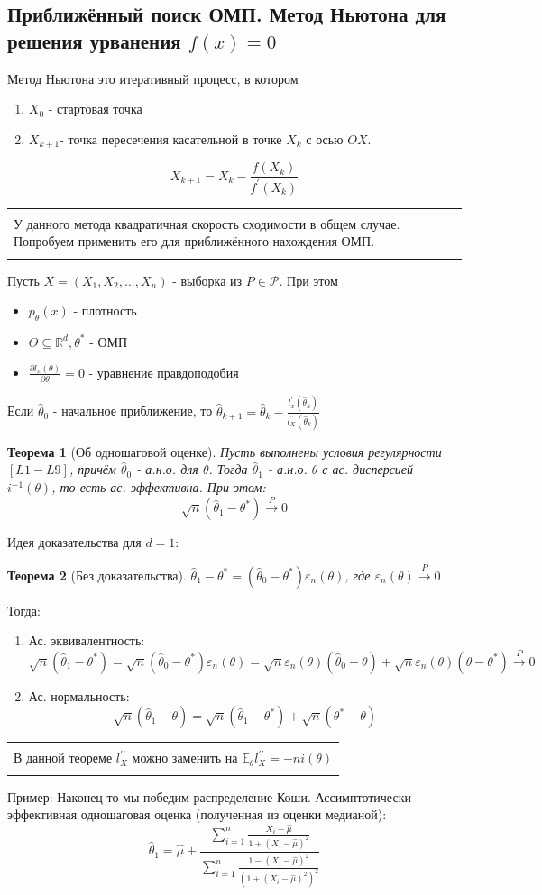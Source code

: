 \documentclass[a4paper,12pt]{article}
\newcommand{\expec}{\mathbb{E}}
\newcommand{\pconv}{\overset{P}{\to}}
\newcommand{\sumin}{\sum\limits_{i=1}^n}
\newcommand{\sample}{X_1, X_2, ..., X_n}
\newcommand{\R}{\mathbb{R}}
\newenvironment{annotation}{\begin{center}
    \begin{tabular}{|p{0.9\textwidth}|}
    \hline\\
}
{ 
    \\\\\hline
    \end{tabular} 
    \end{center}
}
\theoremstyle{named}
\newtheorem*{namedtheorem}{Теорема}
\begin{document}
\subsection{Приближённый поиск ОМП. Метод Ньютона для решения урванения $f(x) = 0$}
Метод Ньютона это итеративный процесс, в котором 
\begin{enumerate}
    \item $X_0$ - стартовая точка
    \item $X_{k+1}$-  точка пересечения касательной в точке $X_k$ с осью $OX$.
\end{enumerate}
$$
    X_{k+1}  = X_k - \frac{f(X_k)}{f^\prime(X_k)}
$$
\begin{annotation}
    У данного метода квадратичная скорость сходимости в общем случае. Попробуем применить его для приближённого нахождения ОМП. 
\end{annotation}
Пусть $X = (\sample)$ - выборка из $P \in \mathcal{P}$. При этом 
\begin{itemize}
    \item $p_\theta(x)$ - плотность 
    \item $\Theta \subseteq \R^d, \theta^*$  - ОМП
    \item $\frac{\partial l_x(\theta)}{\partial \theta} = 0$ - уравнение правдоподобия
\end{itemize}
Если $\hat\theta_0 $ - начальное приближение, то $\hat\theta_{k+1} = \hat\theta_k - \frac{l^\prime_x(\hat\theta_k)}{l_X^{\prime\prime}(\hat\theta_k)}$
\begin{namedtheorem}[Об одношаговой оценке]
    Пусть выполнены условия регулярности $[L1-L9]$, причём $\hat\theta_0$ - а.н.о. для $\theta$. Тогда $\hat\theta_1$ - а.н.о. $\theta$ 
    с ас. дисперсией $i^{-1}(\theta)$, то есть ас. эффективна. При этом:
    $$
        \sqrt{n}(\hat\theta_1 - \theta^*) \pconv 0
    $$
\end{namedtheorem}
Идея доказательства для $d=1$:
\begin{namedtheorem}[Без доказательства]
    $\hat\theta_1 - \theta^* = (\hat\theta_0 - \theta^*)\varepsilon_n(\theta)$, где $\varepsilon_n(\theta) \pconv 0$
\end{namedtheorem}
Тогда:
\begin{enumerate}
    \item Ас. эквивалентность:
    $$
        \sqrt{n}(\hat\theta_1 - \theta^*) = \sqrt{n}(\hat\theta_0 - \theta^*)\varepsilon_n(\theta)  = \sqrt{n}\varepsilon_n(\theta)(\hat\theta_0 -
        \theta) + \sqrt{n}\varepsilon_n(\theta)(\theta - \theta^*) \pconv 0
    $$
    \item Ас. нормальность:
    $$
        \sqrt{n}(\hat\theta_1 - \theta) = \sqrt{n}(\hat\theta_1 - \theta^*) + \sqrt{n}(\theta^* - \theta)
    $$
\end{enumerate}
\begin{annotation}
    В данной теореме $l_X^{\prime\prime}$ можно заменить на $\expec_\theta l_X^{\prime\prime} = -ni(\theta)$
\end{annotation}
Пример: Наконец-то мы победим распределение Коши. Ассимптотически эффективная одношаговая оценка (полученная из оценки медианой):
$$
    \hat\theta_ 1 = \hat\mu + \frac{\sumin \frac{X_i - \hat\mu}{1 + (X_i - \hat\mu)^2}}{\sumin \frac{1-(X_i - \hat\mu)^2}{(1 + (X_i-\hat\mu)^2)^2}}
$$
\end{document}
